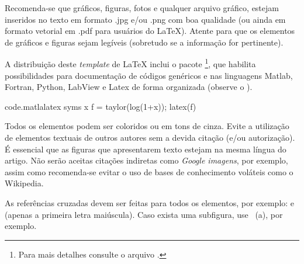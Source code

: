 \documentclass[12pt, a4paper, twoside, twocolumn]{article}
\begin{document}

Recomenda-se que gráficos, figuras, fotos e qualquer arquivo gráfico, estejam inseridos no texto em formato .jpg e/ou .png com boa qualidade (ou ainda em formato vetorial em .pdf para usuários do \LaTeX\xspace). Atente para que os elementos de gráficos e figuras sejam legíveis (sobretudo se a informação for pertinente).

A distribuição deste \textit{template} de \LaTeX\xspace inclui o pacote \footnote{Para mais detalhes consulte o arquivo .}, que habilita possibilidades para documentação de códigos genéricos e nas linguagens Matlab, Fortran, Python, LabView e Latex de forma organizada (observe o ).
%

\begin{matlabcode}{code.matlalatex}
  syms x
  f = taylor(log(1+x));
  latex(f)
\end{matlabcode}

Todos os elementos podem ser coloridos ou em tons de cinza. Evite a utilização de elementos textuais de outros autores sem a devida citação (e/ou autorização). É essencial que as figuras que apresentarem texto estejam na mesma língua do artigo. Não serão aceitas citações indiretas como \textit{Google imagens}, por exemplo, assim como recomenda-se evitar o uso de bases de conhecimento voláteis como o Wikipedia.

As referências cruzadas devem ser feitas para todos os elementos, por exemplo:  e  (apenas a primeira letra maiúscula). Caso exista uma subfigura, use ~(a), por exemplo.
\end{document}
